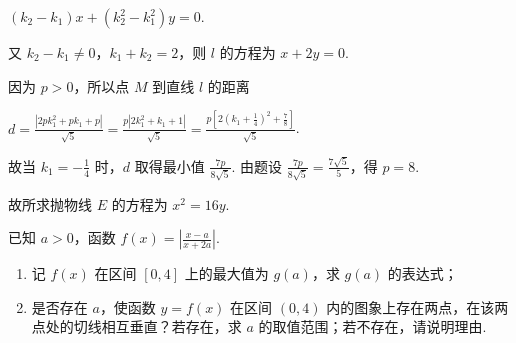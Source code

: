 \begin{solution}
\begin{enumerate}
\((k_2-k_1)x+(k_2^2-k_1^2)y=0\).

又 \(k_2-k_1\ne0\)，\(k_1+k_2=2\)，则 \(l\) 的方程为 \(x+2y=0\).

因为 \(p>0\)，所以点 \(M\) 到直线 \(l\) 的距离

\(d=\frac{\left|2pk_1^2+pk_1+p\right|}{\sqrt{5}}=\frac{p\left|2k_1^2+k_1+1\right|}{\sqrt{5}}=\frac{p\left[2\left(k_1+\frac{1}{4}\right)^2+\frac{7}{8}\right]}{\sqrt{5}}\).

故当 \(k_1=-\frac{1}{4}\) 时，\(d\) 取得最小值 \(\frac{7p}{8\sqrt{5}}\). 由题设 \(\frac{7p}{8\sqrt{5}}=\frac{7\sqrt{5}}{5}\)，得 \(p=8\).

故所求抛物线 \(E\) 的方程为 \(x^2=16y\).
\end{enumerate}
\end{solution}


\begin{problem}
已知 \(a > 0\)，函数 \(f(x) = \left| \frac{x - a}{x + 2a} \right|\).
\begin{enumerate}
\item 记 \(f(x)\) 在区间 \([0, 4]\) 上的最大值为 \(g(a)\)，求 \(g(a)\) 的表达式；
\item 是否存在 \(a\)，使函数 \(y = f(x)\) 在区间 \((0, 4)\) 内的图象上存在两点，在该两点处的切线相互垂直？若存在，求 \(a\) 的取值范围；若不存在，请说明理由.
\end{enumerate}
\end{problem}


